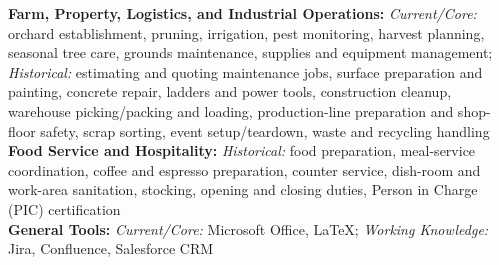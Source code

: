 \textbf{Farm, Property, Logistics, and Industrial Operations:} \textit{Current/Core:} orchard establishment, pruning, irrigation, pest monitoring, harvest planning, seasonal tree care, grounds maintenance, supplies and equipment management; \textit{Historical:} estimating and quoting maintenance jobs, surface preparation and painting, concrete repair, ladders and power tools, construction cleanup, warehouse picking/packing and loading, production-line preparation and shop-floor safety, scrap sorting, event setup/teardown, waste and recycling handling\\
\textbf{Food Service and Hospitality:} \textit{Historical:} food preparation, meal-service coordination, coffee and espresso preparation, counter service, dish-room and work-area sanitation, stocking, opening and closing duties, Person in Charge (PIC) certification\\
\textbf{General Tools:} \textit{Current/Core:} Microsoft Office, LaTeX; \textit{Working Knowledge:} Jira, Confluence, Salesforce CRM

